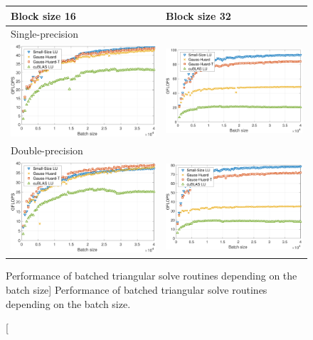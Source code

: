 \begin{figure}[t]
\begin{center}
\begin{tabular}{ll}
Block size 16 & Block size 32\\
\hline
Single-precision\\
\includegraphics[width=.45\columnwidth]{plots/trsv_sgebjp_setup__lu_gje_gh_16.pdf}
&
\includegraphics[width=.45\columnwidth]{plots/trsv_sgebjp_setup__lu_gje_gh_32.pdf}\\
\hline
Double-precision\\
\includegraphics[width=.45\columnwidth]{plots/trsv_dgebjp_setup__lu_gje_gh_16.pdf}
&
\includegraphics[width=.45\columnwidth]{plots/trsv_dgebjp_setup__lu_gje_gh_32.pdf}
\end{tabular}
\end{center}
\caption
[Performance of batched triangular solve routines depending on the batch size]
{%
Performance of batched triangular solve routines depending on the batch size.
}
\label{2017-lu-block-jacobi:fig:performancetrsv}
\end{figure}


